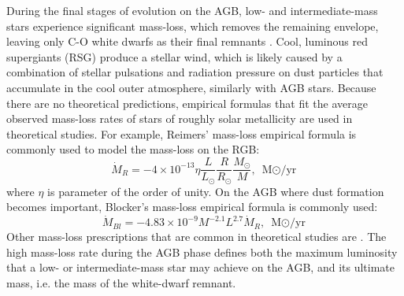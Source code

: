 During the final stages of evolution on the AGB, low- and intermediate-mass stars experience significant mass-loss, which removes the remaining envelope, leaving only C-O white dwarfs as their final remnants \citep{marigo2007evolution, pols2011stellar}. Cool, luminous red supergiants (RSG) produce a stellar wind, which is likely caused by a combination of stellar pulsations and radiation pressure on dust particles that accumulate in the cool outer atmosphere, similarly with AGB stars. Because there are no theoretical predictions, empirical formulas that fit the average observed mass-loss rates of stars of roughly solar metallicity are used in theoretical studies. For example, Reimers' mass-loss empirical formula \citep{reimers1975circumstellar} is commonly used to model the mass-loss on the RGB:
\begin{equation}\label{eq:reimer}
    \dot{M}_{R} = -4 \times 10^{-13} \eta 
    \frac{L}{L_{\odot}}  \frac{R}{R_{\odot}} \frac{M_{\odot}}{M},
    \text{ M${\odot}$/yr}
\end{equation}
where $\eta$ is parameter of the order of unity. On the AGB where dust formation becomes important, Blocker's mass-loss empirical formula \citep{bloecker1995stellarI,bloecker1995stellarII} is commonly used:
\begin{equation}\label{eq:blocker}
    \dot{M}_{Bl} = -4.83 \times 10^{-9} M^{-2.1} L^{2.7} \dot{M}_{R},
    \text{ M${\odot}$/yr}
\end{equation}
Other mass-loss prescriptions that are common in theoretical studies are \cite{de1988mass,nieuwenhuijzen1990parametrization}. The high mass-loss rate during the AGB phase defines both the maximum luminosity that a low- or intermediate-mass star may achieve on the AGB, and its ultimate mass, i.e. the mass of the white-dwarf remnant.

